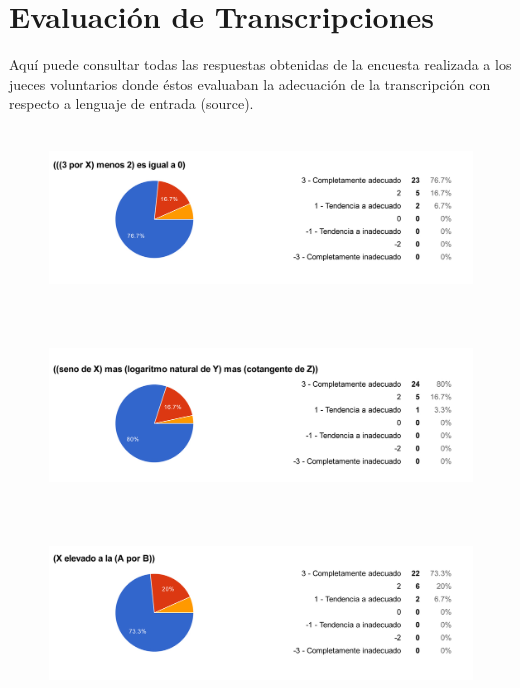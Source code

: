 \chapter{Evaluación de Transcripciones} %

\label{AppendixD} %

Aquí puede consultar todas las respuestas obtenidas de la encuesta realizada a los jueces voluntarios donde éstos evaluaban la adecuación de la transcripción con respecto a lenguaje de entrada (source).

\begin{figure}[H]
\centering
	\includegraphics[width=15cm, height=4.74cm]{Figures/hjudgement/r1}
	\caption[]{}
\label{fig:parsed_corpus}
\end{figure}

\begin{figure}[H]
\centering
	\includegraphics[width=15cm, height=4.74cm]{Figures/hjudgement/r2}
	\caption[]{}
\label{fig:parsed_corpus}
\end{figure}

\begin{figure}[H]
\centering
	\includegraphics[width=15cm, height=4.74cm]{Figures/hjudgement/r3}
	\caption[]{}
\label{fig:parsed_corpus}
\end{figure}

